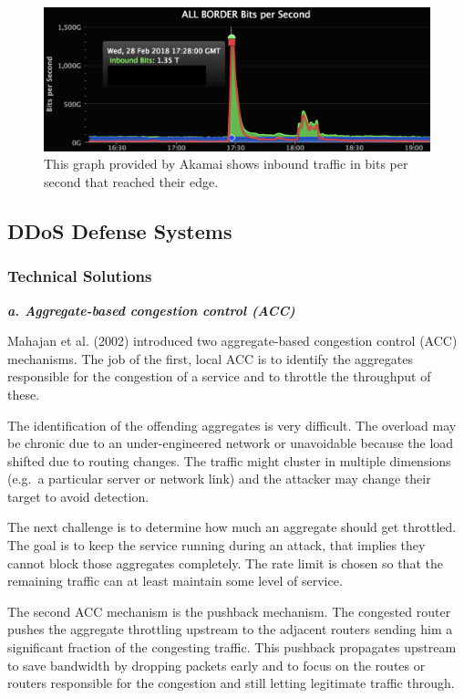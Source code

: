 \begin{figure}[ht]
\begin{center} \includegraphics[scale=0.3]{Talk11/github} \end{center}
\caption{This graph provided by Akamai shows inbound traffic in bits per second that reached their edge.\cite{Kottler18}}
\label{fig:github}
\end{figure}

\subsection{DDoS Defense Systems}
\subsubsection{Technical Solutions}
\textbf{\textit{a. Aggregate-based congestion control (ACC)}}

Mahajan et al. (2002) introduced two aggregate-based congestion control (ACC) mechanisms.
The job of the first, local ACC is to identify the aggregates responsible for the congestion of a service and to throttle the throughput of these.\cite{Mahajan02}

The identification of the offending aggregates is very difficult.
The overload may be chronic due to an under-engineered network or unavoidable because the load shifted due to routing changes.
The traffic might cluster in multiple dimensions (e.g.\ a particular server or network link) and the attacker may change their target to avoid detection.\cite{Mahajan02}

The next challenge is to determine how much an aggregate should get throttled.
The goal is to keep the service running during an attack, that implies they cannot block those aggregates completely.
The rate limit is chosen so that the remaining traffic can at least maintain some level of service.\cite{Mahajan02}

The second ACC mechanism is the pushback mechanism.
The congested router pushes the aggregate throttling upstream to the adjacent routers sending him a significant fraction of the congesting traffic.
This pushback propagates upstream to save bandwidth by dropping packets early and to focus on the routes or routers responsible for the congestion and still letting legitimate traffic through.~\cite{Mahajan02}

